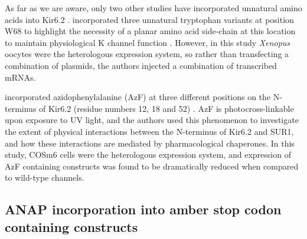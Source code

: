 As far as we are aware, only two other studies have incorporated unnatural amino acids into Kir6.2 \cite{zhang_conserved_2015, devaraneni_structurally_2015}.
\citeauthor{zhang_conserved_2015} incorporated three unnatural tryptophan variants at position W68 to highlight the necessity of a planar amino acid side-chain at this location to maintain physiological K\ATP{} channel function \cite{zhang_conserved_2015}.
However, in this study \textit{Xenopus} oocytes were the heterologous expression system, so rather than transfecting a combination of plasmids, the authors injected a combination of transcribed mRNAs.

\citeauthor{devaraneni_structurally_2015} incorporated azidophenylalanine (AzF) at three different positions on the N-terminus of Kir6.2 (residue numbers 12, 18 and 52) \cite{devaraneni_structurally_2015}.
AzF is photocross-linkable upon exposure to UV light, and the authors used this phenomenon to investigate the extent of physical interactions between the N-terminus of Kir6.2 and SUR1, and how these interactions are mediated by pharmacological chaperones.
In this study, COSm6 cells were the heterologous expression system, and expression of AzF containing constructs was found to be dramatically reduced when compared to wild-type channels.

\subsection{ANAP incorporation into amber stop codon containing constructs}

